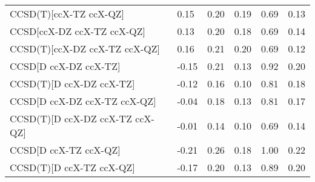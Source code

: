 \begin{table}
\begin{tabular}{l l l l l l }
    CCSD(T)[ccX-TZ ccX-QZ] & 0.15 & 0.20 & 0.19 & 0.69 & 0.13 \\ 
    CCSD[ccX-DZ ccX-TZ ccX-QZ] & 0.13 & 0.20 & 0.18 & 0.69 & 0.14 \\ 
    CCSD(T)[ccX-DZ ccX-TZ ccX-QZ] & 0.16 & 0.21 & 0.20 & 0.69 & 0.12 \\ 
    CCSD[D ccX-DZ ccX-TZ] & -0.15 & 0.21 & 0.13 & 0.92 & 0.20 \\ 
    CCSD(T)[D ccX-DZ ccX-TZ] & -0.12 & 0.16 & 0.10 & 0.81 & 0.18 \\ 
    CCSD[D ccX-DZ ccX-TZ ccX-QZ] & -0.04 & 0.18 & 0.13 & 0.81 & 0.17 \\ 
    CCSD(T)[D ccX-DZ ccX-TZ ccX-QZ] & -0.01 & 0.14 & 0.10 & 0.69 & 0.14 \\ 
    CCSD[D ccX-TZ ccX-QZ] & -0.21 & 0.26 & 0.18 & 1.00 & 0.22 \\ 
    CCSD(T)[D ccX-TZ ccX-QZ] & -0.17 & 0.20 & 0.13 & 0.89 & 0.20 \\ 
    \bottomrule
  \end{tabular}
\end{table}
